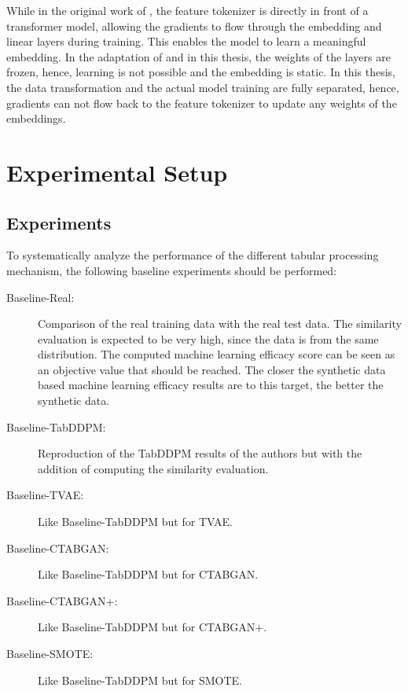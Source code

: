 While in the original work of \cite{gorishniy2021RevisitingDeepLearning}, the feature tokenizer is directly in front of a transformer model, allowing the gradients to flow through the embedding and linear layers during training.
This enables the model to learn a meaningful embedding.
In the adaptation of \cite{2023DiffusionModelsMissing} and in this thesis, the weights of the layers are frozen, hence, learning is not possible and the embedding is static.
In this thesis, the data transformation and the actual model training are fully separated, hence, gradients can not flow back to the feature tokenizer to update any weights of the embeddings.


\section{Experimental Setup}
\label{ch:methods-experimentalSetup}

\subsection{Experiments}
\label{ch:Experiments}

To systematically analyze the performance of the different tabular processing mechanism, the following baseline experiments should be performed:

\begin{description}
    \item[Baseline-Real:] Comparison of the real training data with the real test data. 
    The similarity evaluation is expected to be very high, since the data is from the same distribution.
    The computed machine learning efficacy score can be seen as an objective value that should be reached.
    The closer the synthetic data based machine learning efficacy results are to this target, the better the synthetic data.
    \item[Baseline-TabDDPM:] Reproduction of the TabDDPM results of the authors \cite{kotelnikov2022TabDDPMModellingTabular} but with the addition of computing the similarity evaluation.
    \item[Baseline-TVAE:] Like Baseline-TabDDPM but for TVAE.
    \item[Baseline-CTABGAN:] Like Baseline-TabDDPM but for CTABGAN.
    \item[Baseline-CTABGAN+:] Like Baseline-TabDDPM but for CTABGAN+.
    \item[Baseline-SMOTE:] Like Baseline-TabDDPM but for SMOTE.
\end{description}

